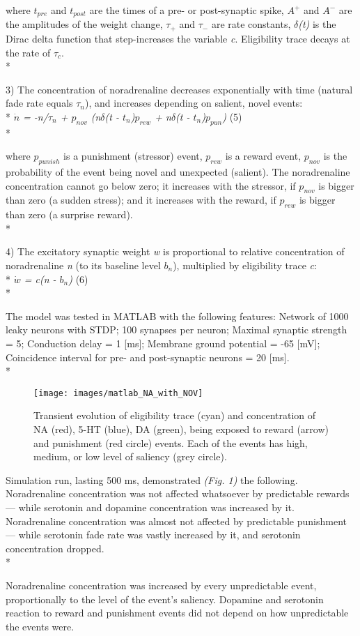 \documentclass[oribibl]{llncs}
\begin{document}
where \textit{$t_{pre}$} and \textit{$t_{post}$} are the times of a pre- or post-synaptic spike, \textit{$A^+$} and \textit{$A^-$} are the amplitudes of the weight change, \textit{$\tau_+$} and \textit{$\tau_-$} are rate constants, \textit{$\delta$(t)} is  the Dirac delta function that step-increases the variable \textit{c}. Eligibility trace decays at the rate of \textit{$τ_c$}. \\*


3) The concentration of noradrenaline decreases exponentially with time (natural fade rate equals $τ_n$), and increases depending on salient, novel events: \\*
\textit{$\dot{n}$ = -n/$\tau_n$ + $p_{nov}$ (n$\delta$(t - $t_n$)$p_{rew}$ + n$\delta$(t - $t_n$)$p_{pun}$)} (5) \\*

where $p_{punish}$ is a punishment (stressor) event, $p_{rew}$ is a reward event, $p_{nov}$ is the probability of the event being novel and unexpected (salient). The noradrenaline concentration cannot go below zero; it increases with the stressor, if $p_{nov}$ is bigger than zero (a sudden stress); and it increases with the reward, if $p_{rew}$ is bigger than zero (a surprise reward). \\*

4) The excitatory synaptic weight \textit{w} is proportional to relative concentration of noradrenaline \textit{n} (to its baseline level \textit{$b_n$}), multiplied by eligibility trace \textit{c}: \\*
\textit{$\dot{w}$ = c(n - $b_n$)} (6) \\*

The model was tested in MATLAB with the following features:
Network of 1000 leaky neurons with STDP; 
100 synapses per neuron;
Maximal synaptic strength = 5;
Conduction delay = 1 [ms];
Membrane ground potential = -65 [mV];
Coincidence interval for pre- and post-synaptic neurons = 20 [ms]. \\*


\begin{figure}
  \caption{ Transient evolution of eligibility trace (cyan) and concentration of NA (red), 5-HT (blue), DA (green), being exposed to reward (arrow) and punishment (red circle) events. Each of the events has high, medium, or low level of saliency (grey circle).}
  \centering
  \texttt{[image: images/matlab\_NA\_with\_NOV]} 
\end{figure}

Simulation run, lasting 500 ms, demonstrated \textit{(Fig. 1)} the following. Noradrenaline concentration was not affected whatsoever by predictable rewards — while serotonin and dopamine concentration was increased by it. Noradrenaline concentration was almost not affected by predictable punishment — while serotonin fade rate was vastly increased by it, and serotonin concentration dropped. \\*

Noradrenaline concentration was increased by every unpredictable event, proportionally to the level of the event's saliency. Dopamine and serotonin reaction to reward and punishment events did not depend on how unpredictable the events were.





\end{document}
